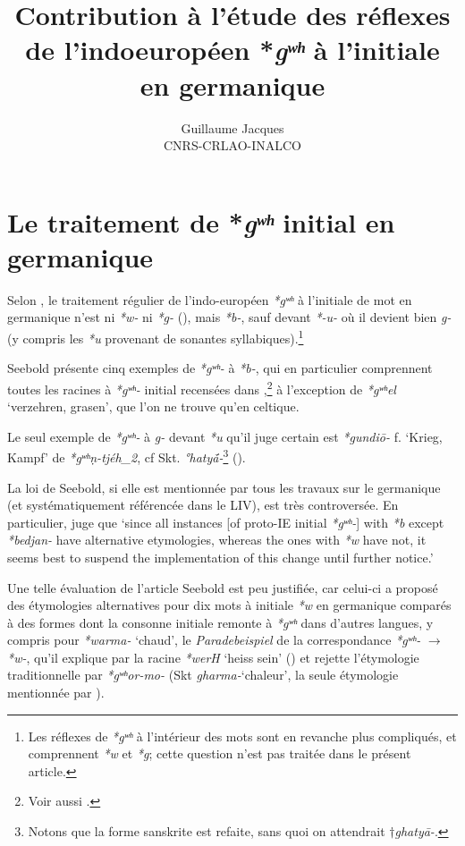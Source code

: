 \documentclass[11pt]{article}
\newcommand{\ipa}[1]{{\phon\textit{#1}}}
\begin{document}
 
\title{Contribution à l'étude des réflexes de l'indoeuropéen *\ipa{gʷʰ} à l'initiale en germanique}
\author{Guillaume Jacques\\ CNRS-CRLAO-INALCO}
\maketitle

\sloppy

\section{Le traitement de *\ipa{gʷʰ} initial en germanique}
Selon \citet{seebold67ghw}, le traitement régulier de l'indo-européen \ipa{*gʷʰ} à l'initiale de mot en germanique n'est ni \ipa{*w-} ni \ipa{*g-} (\citealt[122-3]{streitberg1900urgermanische}), mais \ipa{*b-}, sauf devant \ipa{*-u-} où il devient bien \ipa{g-} (y compris les \ipa{*u} provenant de sonantes syllabiques).\footnote{Les réflexes de \ipa{*gʷʰ} à l'intérieur des mots sont en revanche plus compliqués, et comprennent \ipa{*w} et \ipa{*g}; cette question n'est pas traitée dans le présent article. }

Seebold présente cinq exemples de \ipa{*gʷʰ-} à \ipa{*b-}, qui en particulier comprennent toutes les racines à \ipa{*gʷʰ-} initial recensées dans \citet{liv},\footnote{Voir aussi \citet[note 46]{garnier16dybo}.} à l'exception de \ipa{*gʷʰel} `verzehren, grasen', que l'on ne trouve qu'en celtique.

Le seul exemple de \ipa{*gʷʰ-} à \ipa{g-} devant \ipa{*u} qu'il juge certain est \ipa{*gundiō-} f. `Krieg, Kampf' de \ipa{*gʷʰṇ-tjéh_2}, cf Skt. \ipa{°hatyā́-}\footnote{Notons que la forme sanskrite est refaite, sans quoi on attendrait $\dagger$\ipa{ghatyā-}.} (\citealt[105]{seebold67ghw}).

La loi de Seebold, si elle est mentionnée par tous les travaux sur le germanique (et systématiquement référencée dans le LIV), est très controversée. En particulier, \citet[xxviii]{kroonen13dict} juge que `since all instances [of proto-IE initial \ipa{*gʷʰ-}] with \ipa{*b} except \ipa{*bedjan-} have alternative etymologies, whereas the ones with \ipa{*w} have not, it seems best to suspend the implementation of this change until further notice.'

Une telle évaluation de l'article Seebold est peu justifiée, car celui-ci a proposé des étymologies alternatives pour dix mots à initiale \ipa{*w} en germanique comparés à des formes dont la consonne initiale remonte à \ipa{*gʷʰ} dans d'autres langues, y compris pour \ipa{*warma-} `chaud', le \textit{Paradebeispiel} de la correspondance \ipa{*gʷʰ-} $\rightarrow$ \ipa{*w-}, qu'il explique par la racine \ipa{*werH} `heiss sein' (\citealt[689]{liv}) et rejette l'étymologie traditionnelle par \ipa{*gʷʰor-mo-} (Skt \ipa{gharma-}`chaleur', la seule étymologie mentionnée par \citealt[575]{kroonen13dict}).
\end{document}
